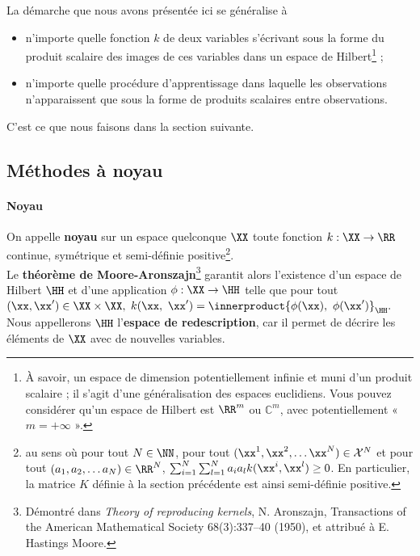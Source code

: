 La démarche que nous avons présentée ici se généralise à
\begin{itemize}
\item n'importe quelle fonction $k$ de deux variables s'écrivant sous la forme
  du produit scalaire des images de ces variables dans un espace de
  Hilbert\footnote{À savoir, un espace de dimension potentiellement infinie et
    muni d'un produit scalaire ; il s'agit d'une généralisation des espaces
    euclidiens. Vous pouvez considérer qu'un espace de Hilbert est $\RR^m$ ou
    $\mathbb{C}^m$, avec potentiellement « $m = +\infty$ ».} ;
\item n'importe quelle procédure d'apprentissage dans laquelle les observations
  n'apparaissent que sous la forme de produits scalaires entre observations.
\end{itemize}
C'est ce que nous faisons dans la section suivante.

\subsection{Méthodes à noyau}
\label{sec:kernels}

\paragraph{Noyau} On appelle \textbf{noyau} sur un espace quelconque $\XX$ toute
fonction $k: \XX \rightarrow \RR$ continue, symétrique et semi-définie
positive\footnote{au sens où
pour tout $N \in \NN$, pour tout $(\xx^1, \xx^2, \dots \xx^N) \in
  \mathcal{X}^N$ et pour tout $(a_1, a_2, \dots a_N) \in \RR^N$, 
  $\sum_{i=1}^N \sum_{l=1}^N a_i a_l k(\xx^i, \xx^l) \geq 0$. En particulier, la matrice $K$ définie à la section précédente est ainsi semi-définie positive.}.\\
Le \textbf{théorème de Moore-Aronszajn}\footnote{Démontré dans \textit{Theory
    of reproducing kernels}, N. Aronszajn, Transactions of the American
  Mathematical Society 68(3):337--40 (1950), et attribué à E. Hastings Moore.}
garantit alors l'existence d'un espace de Hilbert $\HH$ et d'une application
$\phi: \XX \rightarrow \HH$ telle que pour tout
$(\xx, \xx^\prime) \in \XX \times \XX,$
$k(\xx,~\xx^\prime) = \innerproduct{\phi(\xx),~\phi(\xx^\prime)}_\HH.$\\
Nous
appellerons $\HH$ l'\textbf{espace de redescription}, car il permet de décrire les éléments de $\XX$ avec de nouvelles variables.

